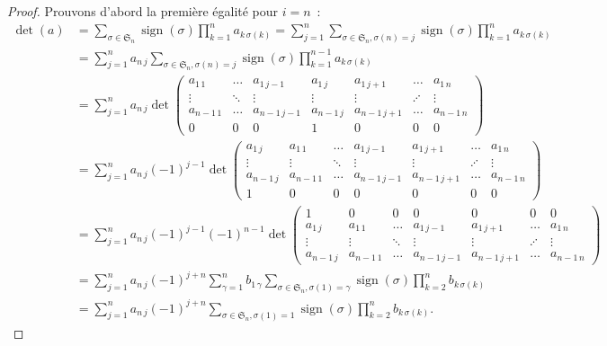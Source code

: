 \documentclass{article}
\DeclareMathOperator{\sign}{sign}
\newcommand{\Perm}{\mathfrak{S}}
\theoremstyle{definition}
\theoremstyle{remark}
\begin{document}
		\begin{proof} Prouvons d'abord la première égalité pour $i=n$~:
		\[\begin{aligned}
			\det(a) &= \sum_{\sigma\in\Perm_n}\sign(\sigma)\prod_{k=1}^na_{k\,\sigma(k)} = \sum_{j=1}^n\sum_{\sigma\in\Perm_n, \sigma(n)=j}\sign(\sigma)\prod_{k=1}^na_{k\,\sigma(k)} \\
			        &= \sum_{j=1}^na_{n\,j}\sum_{\sigma\in\Perm_n, \sigma(n)=j}\sign(\sigma)\prod_{k=1}^{n-1}a_{k\,\sigma(k)} \\
					&= \sum_{j=1}^na_{n\,j}\det
						\begin{pmatrix}
							a_{1\,1}   & \ldots  & a_{1\,j-1}   & a_{1\,j}   & a_{1\,j+1}   & \ldots  & a_{1\,n}   \\
							  \vdots   & \ddots  &   \vdots     &   \vdots   &   \vdots     & \iddots &   \vdots   \\
							a_{n-1\,1} & \ldots  & a_{n-1\,j-1} & a_{n-1\,j} & a_{n-1\,j+1} & \ldots  & a_{n-1\,n} \\
							    0      &     0   &      0       &     1      &     0        &    0    &    0
						\end{pmatrix} \\
					&= \sum_{j=1}^na_{n\,j}(-1)^{j-1}\det
						\begin{pmatrix}
							a_{1\,j}   & a_{1\,1}   & \ldots & a_{1\,j-1}   & a_{1\,j+1}   & \ldots  & a_{1\,n}   \\
							  \vdots   &   \vdots   & \ddots &   \vdots     &   \vdots     & \iddots &   \vdots   \\
							a_{n-1\,j} & a_{n-1\,1} & \ldots & a_{n-1\,j-1} & a_{n-1\,j+1} & \ldots  & a_{n-1\,n} \\
							     1     &     0      &     0  &     0        &      0       &    0    &       0
						\end{pmatrix} \\
					&= \sum_{j=1}^na_{n\,j}(-1)^{j-1}(-1)^{n-1}\det
						\begin{pmatrix}
							     1     &     0      &     0  &     0        &      0       &    0    &       0    \\
							a_{1\,j}   & a_{1\,1}   & \ldots & a_{1\,j-1}   & a_{1\,j+1}   & \ldots  & a_{1\,n}   \\
							  \vdots   &   \vdots   & \ddots &   \vdots     &   \vdots     & \iddots &   \vdots   \\
							a_{n-1\,j} & a_{n-1\,1} & \ldots & a_{n-1\,j-1} & a_{n-1\,j+1} & \ldots  & a_{n-1\,n}
						\end{pmatrix} \\
					&= \sum_{j=1}^na_{n\,j}(-1)^{j+n}\sum_{\gamma=1}^nb_{1\,\gamma}\sum_{\sigma\in\Perm_n, \sigma(1)=\gamma}\sign(\sigma)\prod_{k=2}^nb_{k\,\sigma(k)} \\
					&= \sum_{j=1}^na_{n\,j}(-1)^{j+n}\sum_{\sigma\in\Perm_n, \sigma(1)=1}\sign(\sigma)\prod_{k=2}^nb_{k\,\sigma(k)}.
		\end{aligned}\]


\end{proof}
\end{document}
